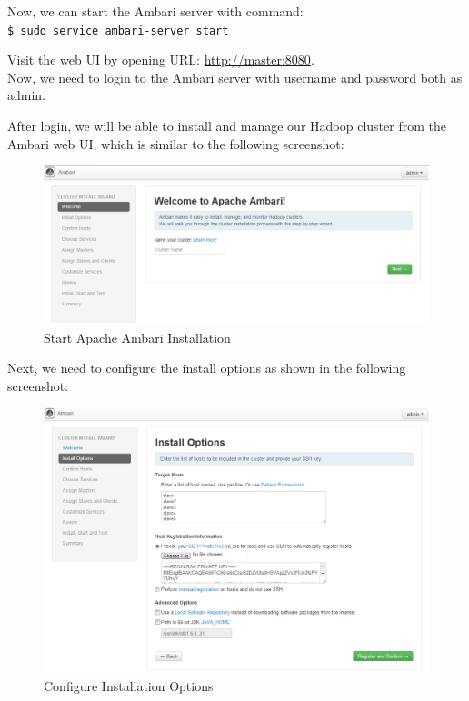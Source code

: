 Now, we can start the Ambari server with command: \\
\verb|$ sudo service ambari-server start|

Visit the web UI by opening URL: \url{http://master:8080}. \\
Now, we need to login to the Ambari server with username and password both as admin.

After login, we will be able to install and manage our Hadoop cluster from the Ambari web UI, which is similar to the following screenshot:
\begin{figure}[h]
  \centering
  \includegraphics[width=.8\textwidth]{figs/5163os_06_14.png}
  \caption{Start Apache Ambari Installation}\label{fig:ambari.welcome}
\end{figure} 


Next, we need to configure the install options as shown in the following screenshot:
\begin{figure}[h]
  \centering
  \includegraphics[width=.8\textwidth]{figs/5163os_06_15.png}
  \caption{Configure Installation Options}\label{fig:ambari.install.options}
\end{figure} 


